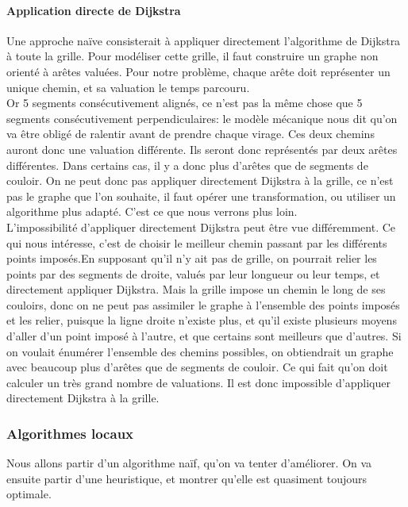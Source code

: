 \paragraph{Application directe de Dijkstra}Une approche naïve consisterait à appliquer directement l'algorithme de Dijkstra à toute la grille. Pour modéliser cette grille, il faut construire un graphe non orienté à arêtes valuées. Pour notre problème, chaque arête doit représenter un unique chemin, et sa valuation le temps parcouru.\\
Or 5 segments consécutivement alignés, ce n'est pas la même chose que 5 segments consécutivement perpendiculaires: le modèle mécanique nous dit qu'on va être obligé de ralentir avant de prendre chaque virage. Ces deux chemins auront donc une valuation différente. Ils seront donc représentés par deux arêtes différentes. Dans certains cas, il y a donc plus d'arêtes que de segments de couloir. On ne peut donc pas appliquer directement Dijkstra à la grille, ce n'est pas le graphe que l'on souhaite, il faut opérer une transformation, ou utiliser un algorithme plus adapté. C'est ce que nous verrons plus loin.\\
L'impossibilité d'appliquer directement Dijkstra peut être vue différemment. Ce qui nous intéresse, c'est de choisir le meilleur chemin passant par les différents points imposés.En supposant qu'il n'y ait pas de grille, on pourrait relier les points par des segments de droite, valués par leur longueur ou leur temps, et directement appliquer Dijkstra. Mais la grille impose un chemin le long de ses couloirs, donc on ne peut pas assimiler le graphe à l'ensemble des points imposés et les relier, puisque la ligne droite n'existe plus, et qu'il existe plusieurs moyens d'aller d'un point imposé à l'autre, et que certains sont meilleurs que d'autres. Si on voulait énumérer l'ensemble des chemins possibles, on obtiendrait un graphe avec beaucoup plus d'arêtes que de segments de couloir. Ce qui fait qu'on doit calculer un très grand nombre de valuations. Il est donc impossible d'appliquer directement Dijkstra à la grille.

\subsubsection{Algorithmes locaux}
Nous allons partir d'un algorithme naïf, qu'on va tenter d'améliorer. On va ensuite partir d'une heuristique, et montrer qu'elle est quasiment toujours optimale.
